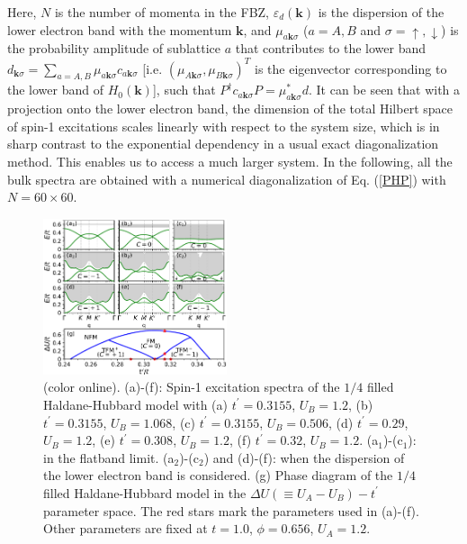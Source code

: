 \documentclass[amsmath,superscriptaddress,showpacs,aps,prl,twocolumn]{revtex4-1}
\begin{document}
Here, $N$ is the number of momenta in the FBZ, $\varepsilon_d(\mathbf{k})$ is the dispersion of the lower electron band with the momentum $\mathbf{k}$, and $\mu_{a\mathbf{k}\sigma}$ ($a=A,B$ and $\sigma=\uparrow,\downarrow$) is the probability amplitude of sublattice $a$ that contributes to the lower band $d_{\mathbf{k}\sigma}=\sum_{a=A,B}\mu_{a\mathbf{k}\sigma}c_{a\mathbf{k}\sigma}$ [i.e. $\left(\mu_{A\mathbf{k}\sigma},\mu_{B\mathbf{k}\sigma}\right)^T$ is the eigenvector corresponding to the lower band of $H_0(\mathbf{k})$], such that $P^\dagger c_{a\mathbf{k}\sigma}P=\mu^\ast_{a\mathbf{k}\sigma}d$. It can be seen \cite{Su_PRB2018,Su_PRB2019} that with a projection onto the lower electron band, the dimension of the total Hilbert space of spin-1 excitations scales linearly with respect to the system size, which is in sharp contrast to the exponential dependency in a usual exact diagonalization method. This enables us to access a much larger system. In the following, all the bulk spectra are obtained with a numerical diagonalization of Eq. (\ref{PHP}) with $N=60\times60$.

\begin{figure}
\centering
\includegraphics[width=0.48\textwidth]{bulkresult}
\caption{(color online). (a)-(f): Spin-1 excitation spectra of the $1/4$ filled Haldane-Hubbard model with (a) $t^\prime=0.3155$, $U_B=1.2$, (b) $t^\prime=0.3155$, $U_B=1.068$, (c) $t^\prime=0.3155$, $U_B=0.506$, (d) $t^\prime=0.29$, $U_B=1.2$, (e) $t^\prime=0.308$, $U_B=1.2$, (f) $t^\prime=0.32$, $U_B=1.2$. (a$_1$)-(c$_1$): in the flatband limit. (a$_2$)-(c$_2$) and (d)-(f): when the dispersion of the lower electron band is considered. (g) Phase diagram of the $1/4$ filled Haldane-Hubbard model in the $\Delta U(\equiv U_A-U_B)-t^\prime$ parameter space. The red stars mark the parameters used in (a)-(f). Other parameters are fixed at $t=1.0$, $\phi=0.656$, $U_A=1.2$.}
\label{bulkresult}
\end{figure}
\end{document}
